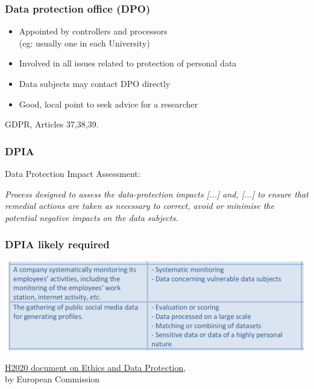 \documentclass[17pt,aspectratio=169,hyperref={pdfusetitle,colorlinks,allcolors=olive}]{beamer}
\begin{document}
\begin{frame}[fragile]
  \frametitle{Data protection office (DPO)}

  \begin{itemize}
  \item Appointed by controllers and processors \\
    (eg: usually one in each University)
  \item Involved in all issues related to protection of personal data
  \item Data subjects may contact DPO directly
  \item Good, local point to seek advice for a researcher
  \end{itemize}
  
  \begin{flushright}
    GDPR, Articles 37,38,39.
  \end{flushright}
  
\end{frame}

\begin{frame}[fragile]
  \frametitle{DPIA}

  Data Protection Impact Assessment:
  \vspace{.3cm}
  
  {\em
    Process designed to   assess   the   data-protection   impacts [...]  and,   [...]  to ensure  that remedial actions are taken as necessary to correct, avoid or minimise the potential negative impacts on the data subjects.
  }
\end{frame}


\begin{frame}[fragile]
  \frametitle{DPIA likely required}

\begin{center}
  \includegraphics[height=3.9cm]{figs/gdpr-dpia-examples}
  \end{center}  
  
  {\footnotesize
    \begin{flushright}
    \href{https://ec.europa.eu/research/participants/data/ref/h2020/grants_manual/hi/ethics/h2020_hi_ethics-data-protection_en.pdf}{H2020 document on Ethics and Data Protection}, \\ by European Commission
  \end{flushright}
  }
\end{frame}
\end{document}
